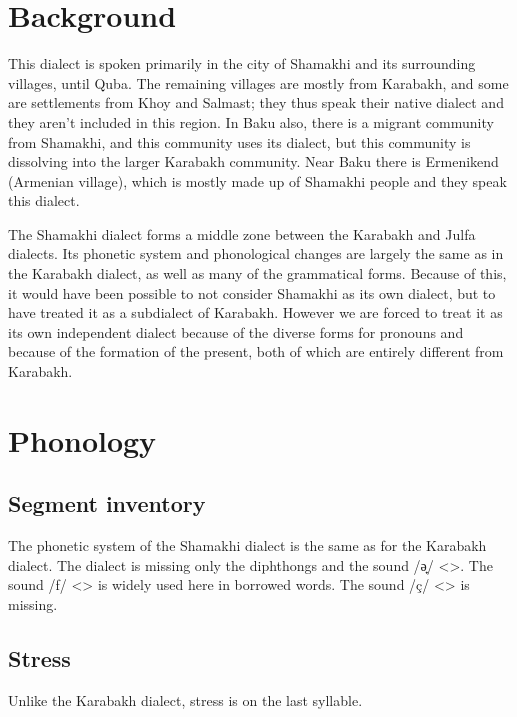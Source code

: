 \section{Background}
This dialect is spoken primarily in the city of Shamakhi and its surrounding villages, until Quba. The remaining villages are mostly  from Karabakh,  and some are settlements from Khoy and Salmast; they thus speak their native dialect and they aren't included in this region. In Baku also, there is a migrant community from Shamakhi, and this community uses its dialect, but this community is dissolving into the larger Karabakh community. Near Baku there is Ermenikend (Armenian village), which is mostly made up of Shamakhi people and they speak this dialect. 

The Shamakhi dialect forms a middle zone between the Karabakh and Julfa dialects. Its phonetic system and phonological changes are largely the same as in the Karabakh dialect, as well as many of the grammatical forms. Because of this, it would have been possible to not consider Shamakhi as its own dialect, but to have treated it as a subdialect of Karabakh. However we are forced to treat it as its own independent dialect because of the diverse forms for pronouns and because of the formation of the present, both of which are entirely different from Karabakh. 

\section{Phonology}

\subsection{Segment inventory}
The phonetic system of the Shamakhi dialect is the same as for the Karabakh dialect. The dialect is missing only the diphthongs and the sound /ə̟/ <>. The sound /f/ <> is widely used here in borrowed words. The sound /ç/ <> is missing. 

\subsection{Stress}
Unlike the Karabakh dialect, stress is on the last syllable. 

